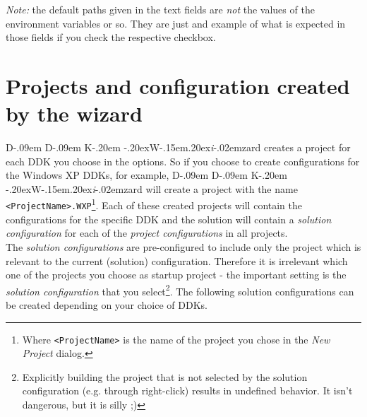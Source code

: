 \documentclass[a4paper,titlepage]{report}
\def\ddkwiz{D\kern-.09em D\kern-.09em K\kern-.20em \raise-.20ex\hbox{W}\kern-.15em\raise.20ex\hbox{\it{i}}\kern-.02em{zard}}
\begin{document}
\emph{Note:} the default paths given in the text fields are \emph{not} the
values of the environment variables or so. They are just and example of what
is expected in those fields if you check the respective checkbox.

\section{Projects and configuration created by the wizard}
\ddkwiz{} creates a project for each DDK you choose in the options. So if
you choose to create configurations for the Windows XP DDKs, for example,
\ddkwiz{} will create a project with the name \texttt{<ProjectName>.WXP}\footnote{Where
\texttt{<ProjectName>} is the name of the project you chose in the \emph{New Project} dialog.}.
Each of these created projects will contain the configurations for the specific
DDK and the solution will contain a \emph{solution configuration} for each of the
\emph{project configurations} in all projects.\\

The \emph{solution configurations} are pre-configured to include only the
project which is relevant to the current (solution) configuration. Therefore it is
irrelevant which one of the projects you choose as startup project - the
important setting is the \emph{solution configuration} that you
select\footnote{Explicitly building the project that is not selected by the
solution configuration (e.g. through right-click) results in undefined
behavior. It isn't dangerous, but it is silly \textsf{;)}}. The following
solution configurations can be created depending on your choice of DDKs.
\end{document}

